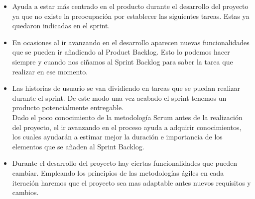 \begin{itemize}
\item Ayuda a estar más centrado en el producto durante el desarrollo del proyecto ya que no existe la preocupación por establecer las siguientes tareas.  Estas ya quedaron indicadas en el sprint. 



\item En ocasiones al ir avanzando en el desarrollo aparecen nuevas funcionalidades que se pueden ir añadiendo al Product Backlog. Esto lo podemos hacer siempre y cuando nos ciñamos al Sprint Backlog
 para saber la tarea que realizar en ese momento.


\item  Las historias de usuario se van dividiendo en tareas que se puedan realizar durante el sprint. De este modo una vez acabado el sprint tenemos un producto potencialmente entregable.\\

Dado el poco conocimiento de la metodología Scrum antes de la realización del proyecto, el ir avanzando en el proceso ayuda a adquirir conocimientos, los cuales ayudarán a estimar mejor la duración e importancia de los elementos que se añaden al Sprint Backlog.


\item
Durante el desarrollo del proyecto hay ciertas funcionalidades que pueden cambiar. Empleando los principios de las metodologías ágiles en cada iteración haremos que el proyecto sea mas adaptable antes nuevos requisitos y cambios.

\end{itemize}

